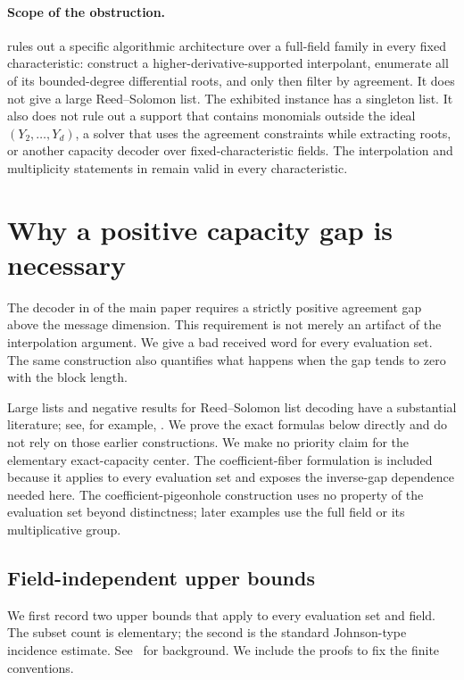 \documentclass[11pt,letterpaper]{article}
\theoremstyle{definition}
\begin{document}
\paragraph{Scope of the obstruction.}
 rules out a
specific algorithmic architecture over a full-field family in every fixed
characteristic: construct a higher-derivative-supported interpolant,
enumerate all of its bounded-degree differential roots, and only then filter
by agreement.  It does not give a large Reed--Solomon list.  The exhibited
instance has a singleton list.  It also does not rule out a support that
contains monomials outside the ideal \((Y_2,\ldots,Y_d)\), a solver that
uses the agreement constraints while extracting roots, or another capacity
decoder over fixed-characteristic fields.  The interpolation and multiplicity statements
in  remain valid in every
characteristic.
 \section{Why a positive capacity gap is necessary}
\label{sec:sharpness}

The decoder in  of the main paper requires a strictly positive agreement gap
above the message dimension.  This requirement is not merely an artifact of
the interpolation argument.  We give a bad received word for every evaluation
set.  The same construction also quantifies what happens when the gap tends to
zero with the block length.

Large lists and negative results for Reed--Solomon list decoding have a
substantial literature; see, for example,
\cite{RR03,GR06,CW07,BKR10}. We prove the exact formulas below directly and
do not rely on those earlier constructions. We make no priority claim for the
elementary exact-capacity center. The coefficient-fiber formulation is
included because it applies to every evaluation set and exposes the
inverse-gap dependence needed here. The coefficient-pigeonhole construction
uses no property of the evaluation set beyond distinctness; later examples
use the full field or its multiplicative group.

\subsection{Field-independent upper bounds}

We first record two upper bounds that apply to every evaluation set and
field. The subset count is elementary; the second is the standard
Johnson-type incidence estimate. See~\cite[Chapter~7]{GRS25} for
background. We include the proofs to fix the finite conventions.
\end{document}
